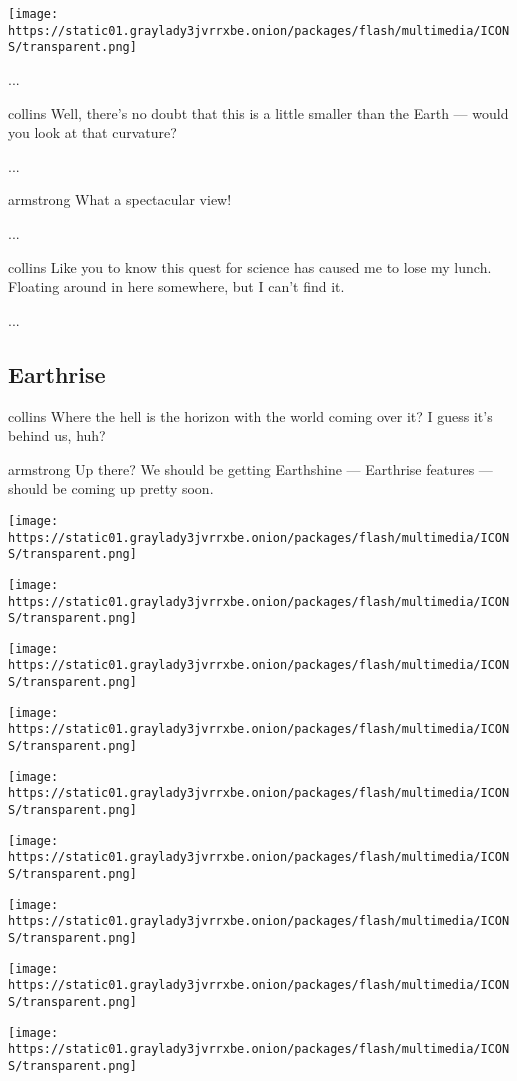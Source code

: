 \texttt{[image: https://static01.graylady3jvrrxbe.onion/packages/flash/multimedia/ICONS/transparent.png]}

...

collins Well, there's no doubt that this is a little smaller than the
Earth --- would you look at that curvature?

...

armstrong What a spectacular view!

...

collins Like you to know this quest for science has caused me to lose my
lunch. Floating around in here somewhere, but I can't find it.

...

\hypertarget{-earthrise-}{%
\subsection{ Earthrise }\label{-earthrise-}}

collins Where the hell is the horizon with the world coming over it? I
guess it's behind us, huh?

armstrong Up there? We should be getting Earthshine --- Earthrise
features --- should be coming up pretty soon.

\texttt{[image: https://static01.graylady3jvrrxbe.onion/packages/flash/multimedia/ICONS/transparent.png]}

\texttt{[image: https://static01.graylady3jvrrxbe.onion/packages/flash/multimedia/ICONS/transparent.png]}

\texttt{[image: https://static01.graylady3jvrrxbe.onion/packages/flash/multimedia/ICONS/transparent.png]}

\texttt{[image: https://static01.graylady3jvrrxbe.onion/packages/flash/multimedia/ICONS/transparent.png]}

\texttt{[image: https://static01.graylady3jvrrxbe.onion/packages/flash/multimedia/ICONS/transparent.png]}

\texttt{[image: https://static01.graylady3jvrrxbe.onion/packages/flash/multimedia/ICONS/transparent.png]}

\texttt{[image: https://static01.graylady3jvrrxbe.onion/packages/flash/multimedia/ICONS/transparent.png]}

\texttt{[image: https://static01.graylady3jvrrxbe.onion/packages/flash/multimedia/ICONS/transparent.png]}

\texttt{[image: https://static01.graylady3jvrrxbe.onion/packages/flash/multimedia/ICONS/transparent.png]}

